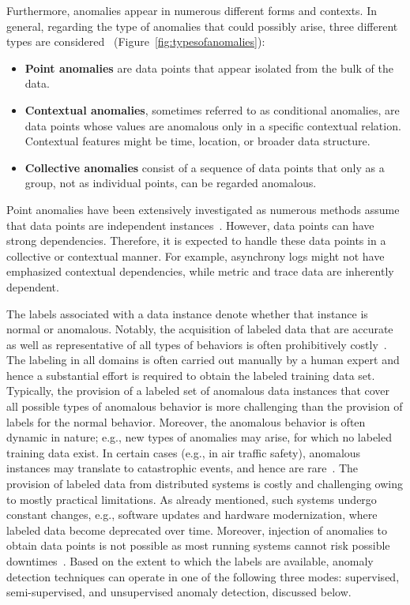 Furthermore, anomalies appear in numerous different forms and contexts. In general, regarding the type of anomalies that could possibly arise, three different types are considered~\cite{chandola2009anomaly} (Figure~\ref{fig:typesofanomalies}):
\begin{itemize}
    \item \textbf{Point anomalies} are data points that appear isolated from the bulk of the data.
    \item \textbf{Contextual anomalies}, sometimes referred to as conditional anomalies, are data points whose values are anomalous only in a specific contextual relation. Contextual features might be time, location, or broader data structure.
    \item \textbf{Collective anomalies} consist of a sequence of data points that only as a group, not as individual points, can be regarded anomalous.
\end{itemize}

Point anomalies have been extensively investigated as numerous methods assume that data points are independent instances~\cite{chandola2009anomaly,gornitz2019one}. However, data points can have strong dependencies. Therefore, it is expected to handle these data points in a collective or contextual manner. For example, asynchrony logs might not have emphasized contextual dependencies, while metric and trace data are inherently dependent.

The labels associated with a data instance denote whether that instance is normal or anomalous. Notably, the acquisition of labeled data that are accurate as well as representative of all types of behaviors is often prohibitively costly~\cite{chandola2009anomaly}. The labeling in all domains is often carried out manually by a human expert and hence a substantial effort is required to obtain the labeled training data set. Typically, the provision of a labeled set of anomalous data instances that cover all possible types of anomalous behavior is more challenging than the provision of labels for the normal behavior. Moreover, the anomalous behavior is often dynamic in nature; e.g., new types of anomalies may arise, for which no labeled training data exist. In certain cases (e.g., in air traffic safety), anomalous instances may translate to catastrophic events, and hence are rare~\cite{ruff2020unifying}. The provision of labeled data from distributed systems is costly and challenging owing to mostly practical limitations. As already mentioned, such systems undergo constant changes, e.g., software updates and hardware modernization, where labeled data become deprecated over time. Moreover, injection of anomalies to obtain data points is not possible as most running systems cannot risk possible downtimes~\cite{gunawi2014bugs,meng2019loganomaly,sillito2020failures}. Based on the extent to which the labels are available, anomaly detection techniques can operate in one of the following three modes: supervised, semi-supervised, and unsupervised anomaly detection, discussed below.


